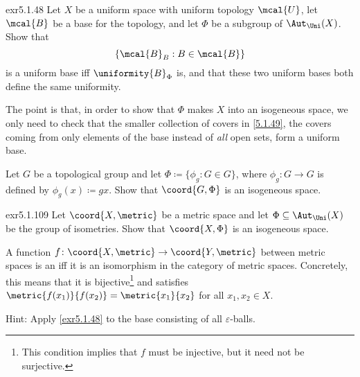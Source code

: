\begin{exr}{}{exr5.1.48}
Let $X$ be a uniform space with uniform topology $\mcal{U}$, let $\mcal{B}$ be a base for the topology, and let $\Phi$ be a subgroup of $\Aut _{\Uni}(X)$.  Show that
\begin{equation}\label{5.1.49}
\left\{ \mcal{B}_B:B\in \mcal{B}\right\}
\end{equation}
is a uniform base iff $\uniformity{B}_\Phi$ is, and that these two uniform bases both define the same uniformity.
\begin{rmk}
The point is that, in order to show that $\Phi$ makes $X$ into an isogeneous space, we only need to check that the smaller collection of covers in \eqref{5.1.49}, the covers coming from only elements of the base instead of \emph{all} open sets, form a uniform base.
\end{rmk}
\end{exr}
\begin{exr}{}{}
Let $G$ be a topological group and let $\Phi \coloneqq \{ \phi _g:G\in G\}$, where $\phi _g:G\rightarrow G$ is defined by $\phi _g(x)\coloneqq gx$.  Show that $\coord{G,\Phi}$ is an isogeneous space.
\end{exr}
\begin{exr}{}{exr5.1.109}
Let $\coord{X,\metric}$ be a metric space and let $\Phi \subseteq \Aut _{\Uni}(X)$ be the group of isometries.  Show that $\coord{X,\Phi}$ is an isogeneous space.
\begin{rmk}
A function $f\colon \coord{X,\metric}\rightarrow \coord{Y,\metric}$ between metric spaces is an  iff it is an isomorphism in the category of metric spaces.  Concretely, this means that it is bijective\footnote{This condition implies that $f$ must be injective, but it need not be surjective.} and satisfies $\metric{f(x_1)}{f(x_2)}=\metric{x_1}{x_2}$ for all $x_1,x_2\in X$.
\end{rmk}
\begin{rmk}
Hint:  Apply \cref{exr5.1.48} to the base consisting of all $\varepsilon$-balls.
\end{rmk}
\end{exr}
